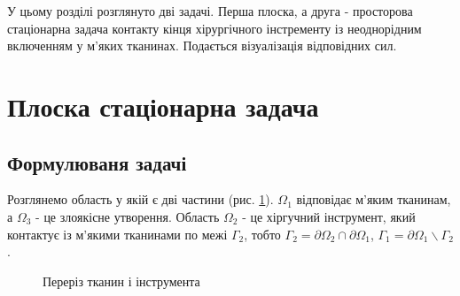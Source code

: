 У цьому розділі розглянуто дві задачі. Перша плоска, а друга - просторова стаціонарна задача контакту кінця хірургічного 
інстременту із неоднорідним включенням у м'яких тканинах. Подається візуалізація відповідних сил.

\section{Плоска стаціонарна задача}

\subsection{Формулюваня задачі}

Розглянемо область у якій є дві частини (рис. \ref{fig:elasticity_2d_domain}). $\Omega_1$ відповідає м'яким тканинам, а
$\Omega_3$ - це злоякісне утворення. Область $\Omega_2$ - це хіргучний інструмент, який контактує із м'якими тканинами
по межі $\Gamma_2$, тобто $\Gamma_2=\partial\Omega_2 \cap \partial\Omega_1$, 
$\Gamma_1 = \partial \Omega_1 \backslash \Gamma_2$.

\begin{figure}[ht!]
    \centering
    
    \caption{Переріз тканин і інструмента}
    \label{fig:elasticity_2d_domain}
\end{figure}


